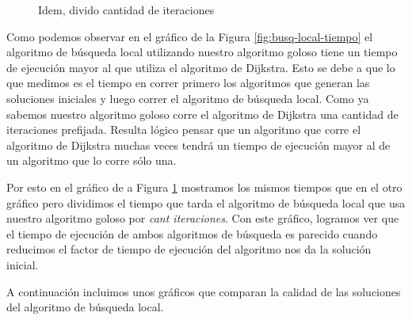 \begin{figure}[H]
\begin{minipage}{0.5\linewidth}
    \caption{Idem, divido cantidad de iteraciones}\label{fig:busq-local-tiempo-div10}
  \end{minipage}
\end{figure}

Como podemos observar en el gráfico de la Figura \ref{fig:busq-local-tiempo} el algoritmo de búsqueda local utilizando nuestro algoritmo goloso tiene un tiempo de ejecución mayor al que utiliza el algoritmo de Dijkstra. Esto se debe a que lo que medimos es el tiempo en correr primero los algoritmos que generan las soluciones iniciales y luego correr el algoritmo de búsqueda local. Como ya sabemos nuestro algoritmo goloso corre el algoritmo de Dijkstra una cantidad de iteraciones prefijada. Resulta lógico pensar que un algoritmo que corre el algoritmo de Dijkstra muchas veces tendrá un tiempo de ejecución mayor al de un algoritmo que lo corre sólo una.

Por esto en el gráfico de a Figura \ref{fig:busq-local-tiempo-div10} mostramos los mismos tiempos que en el otro gráfico pero dividimos el tiempo que tarda el algoritmo de búsqueda local que usa nuestro algoritmo goloso por \emph{cant iteraciones}. Con este gráfico, logramos ver que el tiempo de ejecución de ambos algoritmos de búsqueda es parecido cuando reducimos el factor de tiempo de ejecución del algoritmo nos da la solución inicial.

A continuación incluimos unos gráficos que comparan la calidad de las soluciones del algoritmo de búsqueda local.

